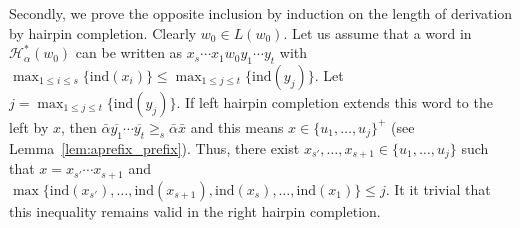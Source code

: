\documentclass{article}
\theoremstyle{plain}
\theoremstyle{remark}
\newcommand{\HC}{\ensuremath{\mathcal{H}}}
\newcommand{\ind}{\ensuremath{\mathrm{ind}}}
\begin{document}
Secondly, we prove the opposite inclusion by induction on the length of derivation by hairpin completion. 
Clearly $w_0 \in L(w_0)$. 
Let us assume that a word in $\HC_\alpha^*(w_0)$ can be written as $x_s \cdots x_1 w_0 y_1 \cdots y_t$ with $\max_{1 \le i \le s}\{\ind(x_i)\} \le \max_{1 \le j \le t}\{\ind(y_j)\}$. 
Let $j = \max_{1 \le j \le t}\{\ind(y_j)\}$. 
If left hairpin completion extends this word to the left by $x$, then $\bar{\alpha} \overline{y_1} \cdots \overline{y_t} \ge_s \bar{\alpha}\bar{x}$ and this means $x \in \{u_1, \ldots, u_j\}^+$ (see Lemma~\ref{lem:aprefix_prefix}). 
Thus, there exist $x_{s'}, \ldots, x_{s+1} \in \{u_1, \ldots, u_j\}$ such that $x = x_{s'} \cdots x_{s+1}$ and $\max\{\ind(x_{s'}), \ldots, \ind(x_{s+1}), \ind(x_s), \ldots, \ind(x_1)\} \le j$. 
It it trivial that this inequality remains valid in the right hairpin completion.  
\end{document}
